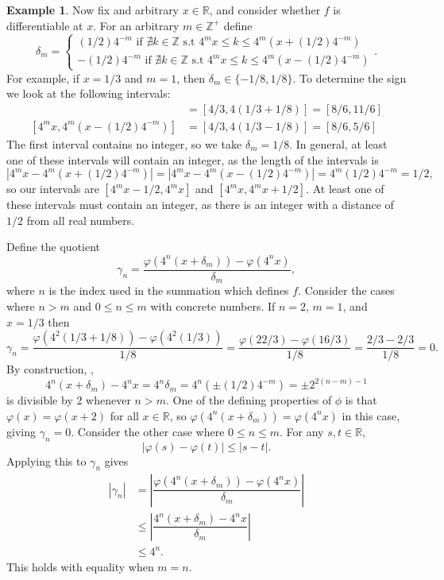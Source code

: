 \documentclass{article}
\newcommand{\R}{\mathbb{R}}
\newcommand{\Z}{\mathbb{Z}}
\theoremstyle{definition}
\newtheorem{example}{Example}[section]
\begin{document}
\begin{example}
	Now fix and arbitrary $ x\in\R $, and consider whether $ f $ is differentiable at $ x $. For an arbitrary $ m\in\Z^+ $ define $$ \delta_m = \begin{cases}
		(1/2)4^{-m}\text{ if }\nexists k\in\Z\text{ s.t } 4^mx\le k \le 4^m(x+	(1/2)4^{-m})\\-(1/2)4^{-m} \text{ if }\nexists k\in\Z\text{ s.t } 4^mx\le k \le4^m(x-	(1/2)4^{-m})
	\end{cases}. $$
For example, if $ x = 1/3 $ and $ m = 1 $, then $ \delta_m \in\{-1/8, 1/8\}$. To determine the sign we look at the following intervals: 
\begin{align*}
	[4^mx, 4^m(x+(1/2)4^{-m})] &= [4/3, 4(1/3+1/8)] = [8/6, 11/6]\\
	[4^mx, 4^m(x-(1/2)4^{-m})] &= [4/3, 4(1/3-1/8)] = [8/6, 5/6]
\end{align*}
The first interval contains no integer, so we take $ \delta_m = 1/8 $. In general, at least one of these intervals will contain an integer, as the length of the intervals is $$ |4^mx  - 4^m(x+(1/2)4^{-m}) | =  |4^mx  - 4^m(x-(1/2)4^{-m})| = 4^m(1/2)4^{-m}= 1/2,$$ so our intervals are $ [4^mx - 1/2, 4^mx ]$ and $ [4^mx, 4^mx + 1/2] $. At least one of these intervals must contain an integer, as there is an integer with a distance of $ 1/2 $ from all real numbers. 

Define the quotient
$$ \gamma_n = \dfrac{\varphi(4^n(x+\delta_m)) - \varphi(4^nx)}{\delta_m},$$ where $ n $ is the index used in the summation which defines $ f $. Consider the cases where $ n > m $ and $ 0\le n \le m $ with concrete numbers. If $ n = 2 $, $ m = 1 $, and $x = 1/3$ then $$ \gamma_n = \dfrac{\varphi(4^2(1/3+1/8)) - \varphi(4^2(1/3))}{1/8} = \dfrac{\varphi(22/3) - \varphi(16/3)}{1/8} = \dfrac{2/3 - 2/3}{1/8} = 0.$$
By construction, ,$$ 4^n(x+\delta_m) - 4^nx = 4^n\delta_m = 4^n(\pm (1/2)4^{-m}) = \pm 2^{2(n-m)-1}  $$ is divisible by 2 whenever $ n > m $. One of the defining properties of $ \phi $ is that $ \varphi(x) = \varphi(x+2)  $ for all $ x\in\R $, so $ \varphi(4^n(x+\delta_m))  = \varphi(4^nx)  $ in this case, giving $ \gamma_n = 0 $. Consider the other case where $  0 \le n \le m $. For any $ s,t\in\R $, $$ |\varphi(s) - \varphi(t)| \le |s - t|.$$ Applying this to $ \gamma_n $ gives 
\begin{align*}
|\gamma_n| &= \left\lvert\dfrac{\varphi(4^n(x+\delta_m)) - \varphi(4^nx)}{\delta_m}\right\rvert\\&\le 
\left\lvert\dfrac{4^n(x+\delta_m) - 4^nx}{\delta_m}\right\rvert\\& \le 4^n.
\end{align*}
This holds with equality when $ m = n $. 


\end{example}
\end{document}
